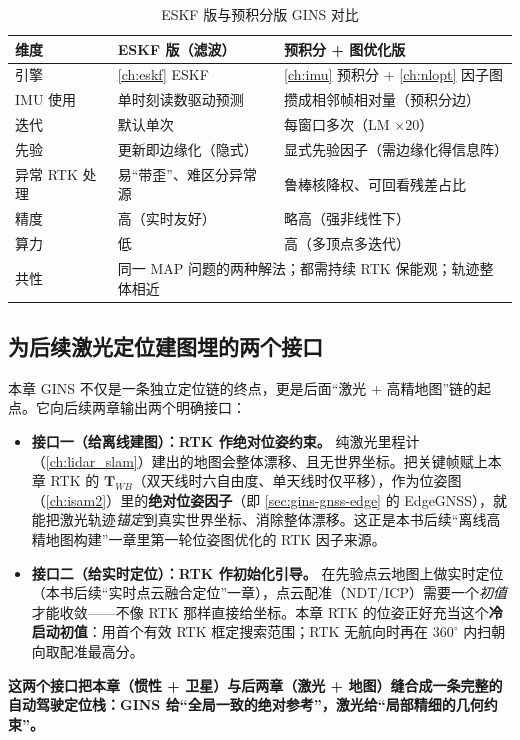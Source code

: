 \begin{table}[H]\centering\small
\caption{ESKF 版与预积分版 GINS 对比}
\label{tab:gins-compare}
\begin{tabular}{p{} p{} p{}}
\toprule
维度 & ESKF 版（滤波） & 预积分 + 图优化版 \\
\midrule
引擎 & \cref{ch:eskf} ESKF & \cref{ch:imu} 预积分 + \cref{ch:nlopt} 因子图 \\
IMU 使用 & 单时刻读数驱动预测 & 攒成相邻帧相对量（预积分边） \\
迭代 & 默认单次 & 每窗口多次（LM $\times 20$） \\
先验 & 更新即边缘化（隐式） & 显式先验因子（需边缘化得信息阵） \\
异常 RTK 处理 & 易“带歪”、难区分异常源 & 鲁棒核降权、可回看残差占比 \\
精度 & 高（实时友好） & 略高（强非线性下） \\
算力 & 低 & 高（多顶点多迭代） \\
共性 & \multicolumn{2}{l}{同一 MAP 问题的两种解法；都需持续 RTK 保能观；轨迹整体相近} \\
\bottomrule
\end{tabular}
\end{table}

\subsection{为后续激光定位建图埋的两个接口}
\label{sec:gins-interface}

本章 GINS 不仅是一条独立定位链的终点，更是后面“激光 + 高精地图”链的起点。它向后续两章输出两个明确接口：
\begin{itemize}
  \item \textbf{接口一（给离线建图）：RTK 作绝对位姿约束。}\;
  纯激光里程计（\cref{ch:lidar_slam}）建出的地图会整体漂移、且无世界坐标。把关键帧赋上本章 RTK 的 $\mathbf{T}_{WB}$（双天线时六自由度、单天线时仅平移），作为位姿图（\cref{ch:isam2}）里的\textbf{绝对位姿因子}（即 \cref{sec:gins-gnss-edge} 的 EdgeGNSS），就能把激光轨迹\emph{锚定}到真实世界坐标、消除整体漂移。这正是本书后续“离线高精地图构建”一章里第一轮位姿图优化的 RTK 因子来源。
  \item \textbf{接口二（给实时定位）：RTK 作初始化引导。}\;
  在先验点云地图上做实时定位（本书后续“实时点云融合定位”一章），点云配准（NDT/ICP）需要一个\emph{初值}才能收敛——不像 RTK 那样直接给坐标。本章 RTK 的位姿正好充当这个\textbf{冷启动初值}：用首个有效 RTK 框定搜索范围；RTK 无航向时再在 $360^\circ$ 内扫朝向取配准最高分。
\end{itemize}
\textbf{这两个接口把本章（惯性 + 卫星）与后两章（激光 + 地图）缝合成一条完整的自动驾驶定位栈：GINS 给“全局一致的绝对参考”，激光给“局部精细的几何约束”。}

